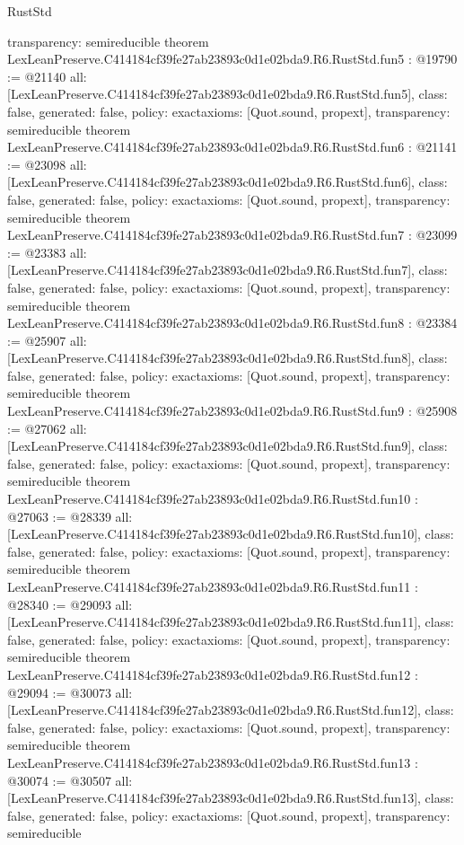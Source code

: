 \begin{lexlean}{RustStd}
\begin{coremodule}
{  transparency: semireducible
}
theorem LexLeanPreserve.C414184cf39fe27ab23893c0d1e02bda9.R6.RustStd.fun5 : @19790 := @21140 {
  all: [LexLeanPreserve.C414184cf39fe27ab23893c0d1e02bda9.R6.RustStd.fun5],
  class: false,
  generated: false,
  policy: exact{axioms: [Quot.sound, propext]},
  transparency: semireducible
}
theorem LexLeanPreserve.C414184cf39fe27ab23893c0d1e02bda9.R6.RustStd.fun6 : @21141 := @23098 {
  all: [LexLeanPreserve.C414184cf39fe27ab23893c0d1e02bda9.R6.RustStd.fun6],
  class: false,
  generated: false,
  policy: exact{axioms: [Quot.sound, propext]},
  transparency: semireducible
}
theorem LexLeanPreserve.C414184cf39fe27ab23893c0d1e02bda9.R6.RustStd.fun7 : @23099 := @23383 {
  all: [LexLeanPreserve.C414184cf39fe27ab23893c0d1e02bda9.R6.RustStd.fun7],
  class: false,
  generated: false,
  policy: exact{axioms: [Quot.sound, propext]},
  transparency: semireducible
}
theorem LexLeanPreserve.C414184cf39fe27ab23893c0d1e02bda9.R6.RustStd.fun8 : @23384 := @25907 {
  all: [LexLeanPreserve.C414184cf39fe27ab23893c0d1e02bda9.R6.RustStd.fun8],
  class: false,
  generated: false,
  policy: exact{axioms: [Quot.sound, propext]},
  transparency: semireducible
}
theorem LexLeanPreserve.C414184cf39fe27ab23893c0d1e02bda9.R6.RustStd.fun9 : @25908 := @27062 {
  all: [LexLeanPreserve.C414184cf39fe27ab23893c0d1e02bda9.R6.RustStd.fun9],
  class: false,
  generated: false,
  policy: exact{axioms: [Quot.sound, propext]},
  transparency: semireducible
}
theorem LexLeanPreserve.C414184cf39fe27ab23893c0d1e02bda9.R6.RustStd.fun10 : @27063 := @28339 {
  all: [LexLeanPreserve.C414184cf39fe27ab23893c0d1e02bda9.R6.RustStd.fun10],
  class: false,
  generated: false,
  policy: exact{axioms: [Quot.sound, propext]},
  transparency: semireducible
}
theorem LexLeanPreserve.C414184cf39fe27ab23893c0d1e02bda9.R6.RustStd.fun11 : @28340 := @29093 {
  all: [LexLeanPreserve.C414184cf39fe27ab23893c0d1e02bda9.R6.RustStd.fun11],
  class: false,
  generated: false,
  policy: exact{axioms: [Quot.sound, propext]},
  transparency: semireducible
}
theorem LexLeanPreserve.C414184cf39fe27ab23893c0d1e02bda9.R6.RustStd.fun12 : @29094 := @30073 {
  all: [LexLeanPreserve.C414184cf39fe27ab23893c0d1e02bda9.R6.RustStd.fun12],
  class: false,
  generated: false,
  policy: exact{axioms: [Quot.sound, propext]},
  transparency: semireducible
}
theorem LexLeanPreserve.C414184cf39fe27ab23893c0d1e02bda9.R6.RustStd.fun13 : @30074 := @30507 {
  all: [LexLeanPreserve.C414184cf39fe27ab23893c0d1e02bda9.R6.RustStd.fun13],
  class: false,
  generated: false,
  policy: exact{axioms: [Quot.sound, propext]},
  transparency: semireducible
}
\end{coremodule}
\end{lexlean}
